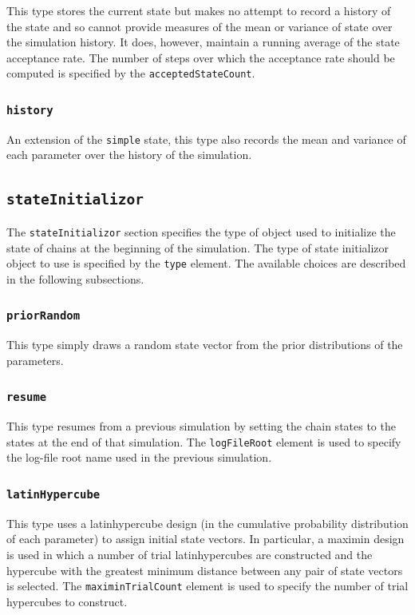 This type stores the current state but makes no attempt to record a history of the state and so cannot provide measures of the mean or variance of state over the simulation history. It does, however, maintain a running average of the state acceptance rate. The number of steps over which the acceptance rate should be computed is specified by the {\tt acceptedStateCount}.

\subsubsection{{\tt history}}

An extension of the {\tt simple} state, this type also records the mean and variance of each parameter over the history of the simulation.

\subsection{{\tt stateInitializor}}

The {\tt stateInitializor} section specifies the type of object used to initialize the state of chains at the beginning of the simulation. The type of state initializor object to use is specified by the {\tt type} element. The available choices are described in the following subsections.

\subsubsection{{\tt priorRandom}}

This type simply draws a random state vector from the prior distributions of the parameters.

\subsubsection{{\tt resume}}

This type resumes from a previous simulation by setting the chain states to the states at the end of that simulation. The {\tt logFileRoot} element is used to specify the log-file root name used in the previous simulation.

\subsubsection{{\tt latinHypercube}}

This type uses a \gls{latinhypercube} design (in the cumulative probability distribution of each parameter) to assign initial state vectors. In particular, a \gls{maximin} design is used in which a number of trial \glspl{latinhypercube} are constructed and the hypercube with the greatest minimum distance between any pair of state vectors is selected. The {\tt maximinTrialCount} element is used to specify the number of trial hypercubes to construct.

